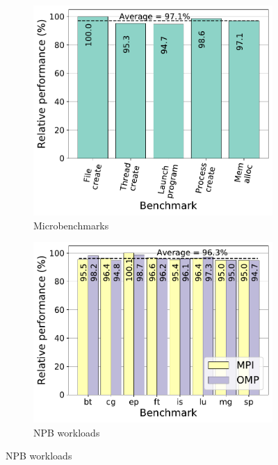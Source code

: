 \documentclass[letterpaper,twocolumn,10pt]{article}
\begin{document}
\begin{figure}[!t]
  \centering
  \begin{subfigure}[b]{.33\textwidth}
    \includegraphics[width=\linewidth]{img/ubench_performance.pdf}
    \caption{Microbenchmarks}
    \label{fig:ubench_performance}    
  \end{subfigure}
  \begin{subfigure}[b]{.33\textwidth}
    \includegraphics[width=\linewidth]{img/npb_performance.pdf}
    \caption{NPB workloads}
    \label{fig:npb_performance}    
  \end{subfigure}

\end{figure}
\end{document}
